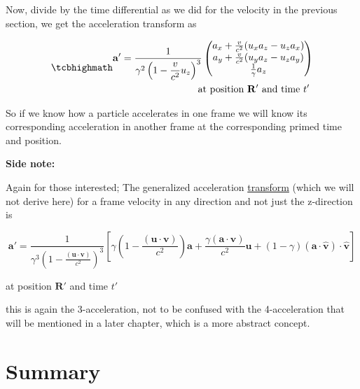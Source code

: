 Now, divide by the time differential as we did for the velocity in the previous section, we get the acceleration transform as

\begin{equation}
	\mhl{
		\begin{aligned}
			\mathbf{a}{'} = \dfrac{1}{{\gamma}^2\left(1-\dfrac{v}{{c}^2} {{u}_{z}}\right)^3 }
			\begin{pmatrix}
				{{a}_{x}} + \frac{v}{{c}^2}({{u}_{x}} {{a}_{z}}-{{u}_{z}} {{a}_{x}}) \\
				{{a}_{y}} + \frac{v}{{c}^2}({{u}_{y}} {{a}_{z}}-{{u}_{z}} {{a}_{y}}) \\
				\frac{1}{{\gamma}} {{a}_{z}}                                         \\
			\end{pmatrix}
			\\
			\text{at position ${\mathbf{R}{'}}$ and time ${t{'}}$ }
		\end{aligned}
	}
	\label{eq: acceleration transform}
\end{equation}

So if we know how a particle accelerates in one frame we will know its corresponding acceleration in another frame at the corresponding primed time and position.

\textbf{Side note:}

Again for those interested; The generalized acceleration \hyperlink{def-transform}{transform} (which we will not derive here) for a frame velocity in any direction and not just the z-direction is

\begin{equation}
	\mathbf{a{'}} = \frac{1}{{\gamma} ^3 \left(1-\frac{(\mathbf{u}\cdot \mathbf{v})}{{c}^2}\right)^3}\left[ {\gamma} \left(1-\frac{(\mathbf{u}\cdot\mathbf{v})}{{c}^2}\right)\mathbf{a} + \frac{{\gamma} (\mathbf{a}\cdot\mathbf{v})}{{c}^2}\mathbf{u} + (1-{\gamma} ) (\mathbf{a}\cdot\hat{\mathbf{v}}) \cdot\hat{\mathbf{v}}\right]
\end{equation}

at position ${\mathbf{R}{'}}$ and time ${t{'}}$

this is again the 3-acceleration, not to be confused with the 4-acceleration that will be mentioned in a later chapter, which is a more abstract concept.

\section{Summary}

